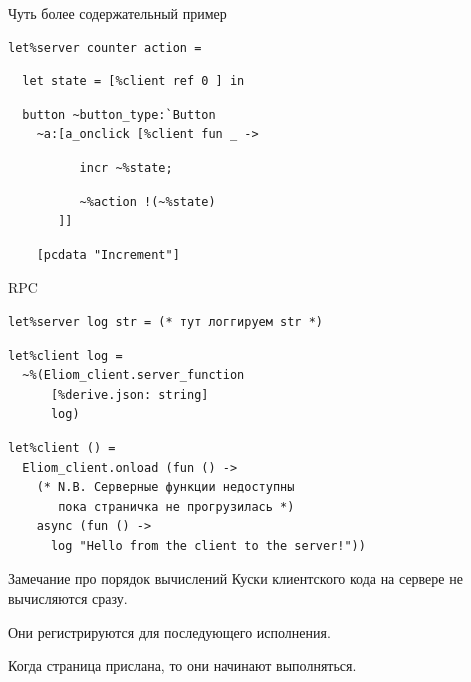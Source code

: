 \documentclass{beamer}
\theoremstyle{definition}
\begin{document}
\begin{frame}[fragile]{Чуть более содержательный пример}
\begin{verbatim}
let%server counter action =
\end{verbatim}
\pause\vspace{-1em}
\begin{verbatim}
  let state = [%client ref 0 ] in
\end{verbatim}
\pause\vspace{-1em}
\begin{verbatim}
  button ~button_type:`Button
    ~a:[a_onclick [%client fun _ ->
\end{verbatim}
\pause\vspace{-1em}
\begin{verbatim}
          incr ~%state;
\end{verbatim}
\pause\vspace{-1em}
\begin{verbatim}
          ~%action !(~%state) 
       ]]
\end{verbatim}
\pause\vspace{-1em}
\begin{verbatim}
    [pcdata "Increment"]
\end{verbatim}
\end{frame}

\begin{frame}[fragile]{RPC}
\begin{verbatim}
let%server log str = (* тут логгируем str *)
\end{verbatim}
\pause\vspace{-2pt}
\begin{verbatim}
let%client log =
  ~%(Eliom_client.server_function 
      [%derive.json: string] 
      log)
\end{verbatim}
\pause\vspace{-2pt}
\begin{verbatim}
let%client () =
  Eliom_client.onload (fun () ->
    (* N.B. Серверные функции недоступны
       пока страничка не прогрузилась *)
    async (fun () -> 
      log "Hello from the client to the server!"))
\end{verbatim}
\end{frame}

\begin{frame}{Замечание про порядок вычислений}
Куски клиентского кода на сервере не вычисляются сразу.

Они регистрируются для последующего исполнения.

Когда страница прислана, то они начинают выполняться.
\end{frame}
\end{document}
